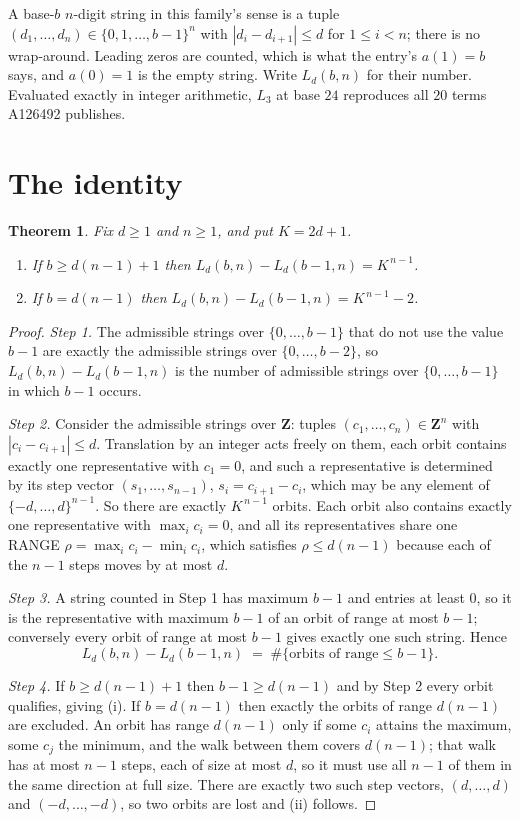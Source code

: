 \documentclass[11pt,a4paper]{article}
\theoremstyle{plain}
\newtheorem{theorem}{Theorem}
\theoremstyle{definition}
\begin{document}
A base-$b$ $n$-digit string in this family's sense is a tuple
$(d_1,\dots,d_n)\in\{0,1,\dots,b-1\}^{n}$ with $|d_i-d_{i+1}|\le d$ for $1\le i<n$; there
is no wrap-around. Leading zeros are counted, which is what the entry's $a(1)=b$ says, and
$a(0)=1$ is the empty string. Write $L_d(b,n)$ for their number. Evaluated exactly in integer
arithmetic, $L_{3}$ at base $24$ reproduces all $20$ terms A126492 publishes.

\section{The identity}

\begin{theorem}
Fix $d\ge1$ and $n\ge1$, and put $K=2d+1$.
\begin{enumerate}
\item[(i)] If $b\ge d(n-1)+1$ then $L_d(b,n)-L_d(b-1,n)=K^{\,n-1}$.
\item[(ii)] If $b=d(n-1)$ then $L_d(b,n)-L_d(b-1,n)=K^{\,n-1}-2$.
\end{enumerate}
\end{theorem}

\begin{proof}
\emph{Step 1.} The admissible strings over $\{0,\dots,b-1\}$ that do not use the value $b-1$
are exactly the admissible strings over $\{0,\dots,b-2\}$, so $L_d(b,n)-L_d(b-1,n)$ is the
number of admissible strings over $\{0,\dots,b-1\}$ in which $b-1$ occurs.

\emph{Step 2.} Consider the admissible strings over $\mathbf{Z}$: tuples
$(c_1,\dots,c_n)\in\mathbf{Z}^{n}$ with $|c_i-c_{i+1}|\le d$. Translation by an integer acts
freely on them, each orbit contains exactly one representative with $c_1=0$, and such a
representative is determined by its step vector $(s_1,\dots,s_{n-1})$, $s_i=c_{i+1}-c_i$,
which may be any element of $\{-d,\dots,d\}^{n-1}$. So there are exactly $K^{\,n-1}$ orbits.
Each orbit also contains exactly one representative with $\max_i c_i=0$, and all its
representatives share one RANGE $\rho=\max_ic_i-\min_ic_i$, which satisfies
$\rho\le d(n-1)$ because each of the $n-1$ steps moves by at most $d$.

\emph{Step 3.} A string counted in Step 1 has maximum $b-1$ and entries at least $0$, so it is
the representative with maximum $b-1$ of an orbit of range at most $b-1$; conversely every orbit
of range at most $b-1$ gives exactly one such string. Hence
\[
L_d(b,n)-L_d(b-1,n)\;=\;\#\{\text{orbits of range}\le b-1\} .
\]

\emph{Step 4.} If $b\ge d(n-1)+1$ then $b-1\ge d(n-1)$ and by Step 2 every orbit qualifies,
giving (i). If $b=d(n-1)$ then exactly the orbits of range $d(n-1)$ are excluded. An orbit has
range $d(n-1)$ only if some $c_i$ attains the maximum, some $c_j$ the minimum, and the walk
between them covers $d(n-1)$; that walk has at most $n-1$ steps, each of size at most $d$, so it
must use all $n-1$ of them in the same direction at full size. There are exactly two such step
vectors, $(d,\dots,d)$ and $(-d,\dots,-d)$, so two orbits are lost and (ii) follows.
\end{proof}
\end{document}
